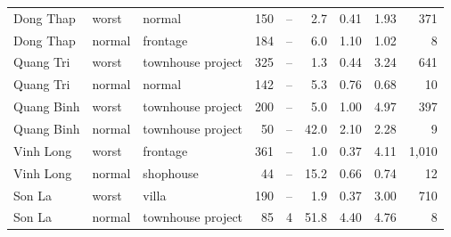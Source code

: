 {\begin{longtable}{lllrrrrrr}
Dong Thap & worst & normal & 150 & -- & 2.7 & 0.41 & 1.93 & 371 \\
Dong Thap & normal & frontage & 184 & -- & 6.0 & 1.10 & 1.02 & 8 \\
Quang Tri & worst & townhouse project & 325 & -- & 1.3 & 0.44 & 3.24 & 641 \\
Quang Tri & normal & normal & 142 & -- & 5.3 & 0.76 & 0.68 & 10 \\
Quang Binh & worst & townhouse project & 200 & -- & 5.0 & 1.00 & 4.97 & 397 \\
Quang Binh & normal & townhouse project & 50 & -- & 42.0 & 2.10 & 2.28 & 9 \\
Vinh Long & worst & frontage & 361 & -- & 1.0 & 0.37 & 4.11 & 1,010 \\
Vinh Long & normal & shophouse & 44 & -- & 15.2 & 0.66 & 0.74 & 12 \\
Son La & worst & villa & 190 & -- & 1.9 & 0.37 & 3.00 & 710 \\
Son La & normal & townhouse project & 85 & 4 & 51.8 & 4.40 & 4.76 & 8 \\
\end{longtable}}
